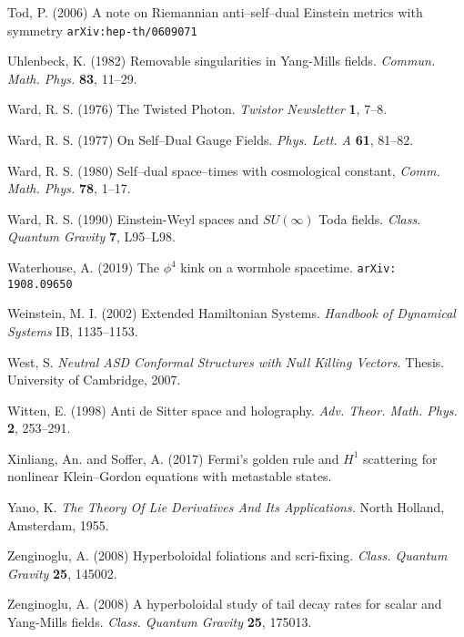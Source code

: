 \begin{thebibliography}{}
 Tod, P. (2006) {A note on Riemannian anti--self--dual Einstein metrics with symmetry}
{\tt arXiv:hep-th/0609071}


 Uhlenbeck, K. (1982) Removable singularities in Yang-Mills fields.
\textit{Commun. Math. Phys.} {\bf 83}, 11--29.

 Ward, R. S. (1976)
The Twisted Photon.
\textit{Twistor Newsletter} {\bf 1}, 7--8.

 Ward, R. S. (1977)
On Self--Dual Gauge Fields.
\textit{Phys. Lett. A} {\bf 61}, 81--82.

   Ward, R. S. (1980)
Self--dual space--times with cosmological constant,
\textit{Comm. Math. Phys.} {\bf 78},  1--17.

 Ward, R. S. (1990) Einstein-Weyl spaces and 
$SU(\infty)$ Toda fields. \textit{Class. Quantum Gravity} {\bf 7}, L95--L98.

 Waterhouse, A. (2019)
The $\phi^4$ kink on a wormhole spacetime. {\tt arXiv: 1908.09650}

 Weinstein, M. I. (2002)
Extended Hamiltonian Systems. \textit{Handbook of Dynamical Systems} IB, 1135--1153.

 West, S. {\em Neutral ASD Conformal Structures with Null Killing Vectors.} Thesis. University of Cambridge, 2007.

 Witten, E. (1998)
Anti de Sitter space and holography. \textit{Adv. Theor. Math. Phys.} {\bf 2}, 253--291.

 Xinliang, An. and Soffer, A. (2017)
Fermi's golden rule and $H^1$ scattering for nonlinear Klein--Gordon equations with metastable states.



 Yano, K. {\em The Theory Of Lie Derivatives And Its Applications.} North Holland, Amsterdam, 1955.

 Zenginoglu, A. (2008)
Hyperboloidal foliations and scri-fixing. \textit{Class. Quantum Gravity} {\bf 25}, 145002.

 Zenginoglu, A. (2008)
A hyperboloidal study of tail decay rates for scalar and Yang-Mills fields. \textit{Class. Quantum Gravity} {\bf 25}, 175013.





\end{thebibliography}
